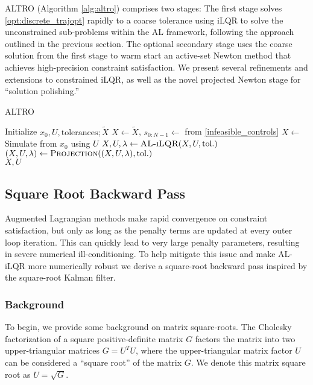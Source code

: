 \documentclass[../root.tex]{subfiles}
\begin{document}
ALTRO (Algorithm \ref{alg:altro}) comprises two
stages: The first stage solves \eqref{opt:discrete_trajopt} rapidly to a
coarse tolerance using iLQR to solve the unconstrained sub-problems within
the AL framework, following the approach outlined in the previous section.
The optional secondary stage uses the coarse solution from the first stage to
warm start an active-set Newton method that achieves high-precision
constraint satisfaction. We present several refinements and extensions to
constrained iLQR, as well as the novel projected Newton stage for ``solution
polishing.''

\begin{algorithm}
\begin{algorithmic}[1]
\caption{ALTRO} \label{alg:altro}
\Procedure{}{}
\State Initialize $x_0, U, \text{tolerances}; \tilde{X}$
\State $X \leftarrow \tilde{X}$, $s_{0:N{-}1} \leftarrow$ from \eqref{infeasible_controls}
\Else 
\State $X \leftarrow$ Simulate from $x_0$ using $U$
\EndIf
\State $X,U,\lambda \leftarrow \textproc{AL-iLQR}(X,U,\text{tol}.)$
\State $(X,U,\lambda) \leftarrow \textproc{Projection}((X,U,\lambda),\text{tol}.)$ \\
\Return $X,U$
\EndProcedure
\end{algorithmic}
\end{algorithm}

\subsection{Square Root Backward Pass}
Augmented Lagrangian methods make rapid convergence on constraint
satisfaction, but only as long as the penalty terms are updated at every
outer loop iteration. This can quickly lead to very large penalty parameters,
resulting in severe numerical ill-conditioning. To help mitigate this issue
and make AL-iLQR more numerically robust we derive a square-root backward
pass inspired by the square-root Kalman filter.

\subsubsection{Background}
To begin, we provide some background on matrix square-roots. The Cholesky
factorization of a square positive-definite matrix $G$ factors the matrix
into two upper-triangular matrices $G = U^T U$, where the upper-triangular
matrix factor $U$ can be considered a ``square root'' of the matrix $G$. We
denote this matrix square root as $U = \sqrt{G}$.
\end{document}
